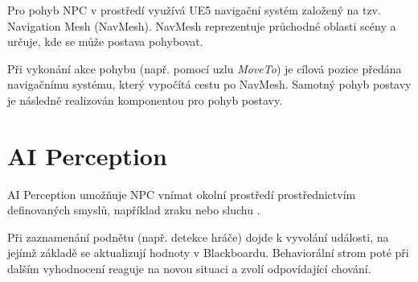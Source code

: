 Pro pohyb NPC v prostředí využívá UE5 navigační systém založený na tzv. Navigation Mesh (NavMesh). 
NavMesh reprezentuje průchodné oblasti scény a určuje, kde se může postava pohybovat.\cite{epic_navsystem} 

Při vykonání akce pohybu (např. pomocí uzlu \textit{MoveTo}) je cílová pozice předána navigačnímu systému, který vypočítá cestu po NavMesh. 
Samotný pohyb postavy je následně realizován komponentou pro pohyb postavy.

\section{AI Perception}

AI Perception umožňuje NPC vnímat okolní prostředí prostřednictvím definovaných smyslů, například zraku nebo sluchu \cite{epic_perception}. 

Při zaznamenání podnětu (např. detekce hráče) dojde k vyvolání události, na jejímž základě se aktualizují hodnoty v Blackboardu. 
Behaviorální strom poté při dalším vyhodnocení reaguje na novou situaci a zvolí odpovídající chování.
